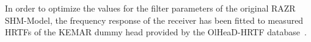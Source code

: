 In order to optimize the values for the filter parameters of the
original RAZR SHM-Model, the frequency response of the receiver has
been fitted to measured HRTFs of the KEMAR dummy
head \citep{Schwark2020} provided by the OlHeaD-HRTF
database~\citep{Denk2020}.




